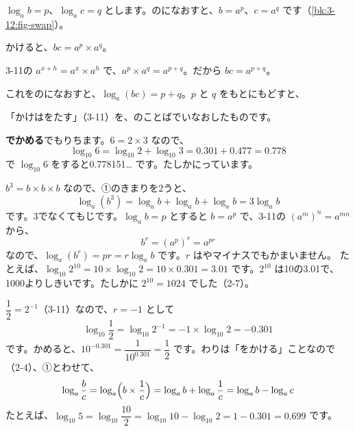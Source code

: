 $\log_ab=p$、$\log_ac=q$ とします。のになおすと、$b=a^p$、$c=a^q$ です（\ref{bk:3-12:fig-swap}）。
\begin{enumerate}[label={\bkcircled[bkTheme]{\arabic*}}, leftmargin=2.4\zw, itemsep=1pt, topsep=2pt]
\item かけると、$bc=a^p\times a^q$。
\item 3-11の $a^{x+h}=a^x\times a^h$ で、$a^p\times a^q=a^{p+q}$。だから $bc=a^{p+q}$。
\item これをのになおすと、$\log_a(bc)=p+q$。$p$ と $q$ をもとにもどすと、
\end{enumerate}
「かけはをたす」（3-11）を、のことばでいなおしたものです。

\textbf{でかめる}\quad {}でもりちます。$6=2\times3$ なので、
\[ \log_{10}6=\log_{10}2+\log_{10}3=0.301+0.477=0.778 \]
で $\log_{10}6$ をすると0.778151… です。たしかにっています。

$b^3=b\times b\times b$ なので、①のきまりを2うと、
\[ \log_a(b^3)=\log_ab+\log_ab+\log_ab=3\log_ab \]
です。3でなくてもじです。$\log_ab=p$ とすると $b=a^p$ で、3-11の $(a^m)^n=a^{mn}$ から、
\[ b^r=(a^p)^r=a^{pr} \]
なので、$\log_a(b^r)=pr=r\log_ab$ です。$r$ はやマイナスでもかまいません。
たとえば、$\log_{10}2^{10}=10\times\log_{10}2=10\times0.301=3.01$ です。$2^{10}$ は10の3.01で、1000よりしきいです。たしかに $2^{10}=1024$ でした（2-7）。

$\dfrac{1}{2}=2^{-1}$（3-11）なので、$r=-1$ として
\[ \log_{10}\frac{1}{2}=\log_{10}2^{-1}=-1\times\log_{10}2=-0.301 \]
です。かめると、$10^{-0.301}=\dfrac{1}{10^{0.301}}=\dfrac{1}{2}$ です。わりは「をかける」ことなので（2-4）、①とわせて、
\[ \log_a\frac{b}{c}=\log_a\Bigl(b\times\frac{1}{c}\Bigr)=\log_ab+\log_a\frac{1}{c}=\log_ab-\log_ac \]
たとえば、$\log_{10}5=\log_{10}\dfrac{10}{2}=\log_{10}10-\log_{10}2=1-0.301=0.699$ です。

